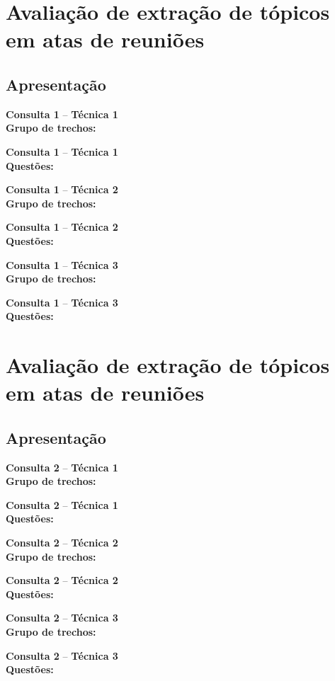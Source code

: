 \documentclass{article}
\newcommand{\resultsheader}[2] {
	\noindent \textbf{Consulta #1} -- \textbf{Técnica #2}
	 \vspace{0.5 cm} \\
	
}
\newcommand{\textfiled}{

	\vspace{0.5cm}
	\begin{tcolorbox}[colback = white]
		\vspace{1cm}

	\end{tcolorbox}
}
\begin{document}
\pagestyle{empty}

\section*{Avaliação de extração de tópicos em atas de reuniões}
\vspace{1cm}






\subsection*{Apresentação}


\textfiled

\newpage \resultsheader{1}{1} \noindent \textbf{Grupo de trechos:}
 
\newpage \resultsheader{1}{1}  \noindent \textbf{Questões:}


\newpage \resultsheader{1}{2} \noindent \textbf{Grupo de trechos:}
 	
\newpage  \resultsheader{1}{2} \noindent \textbf{Questões:}


\newpage \resultsheader{1}{3} \noindent \textbf{Grupo de trechos:}
 	
\newpage  \resultsheader{1}{3}  \noindent \textbf{Questões:}










\newpage


\section*{Avaliação de extração de tópicos em atas de reuniões}
\vspace{1cm}


\subsection*{Apresentação}


\textfiled

\newpage \resultsheader{2}{1} \noindent \textbf{Grupo de trechos:}
 
\newpage \resultsheader{2}{1}  \noindent \textbf{Questões:}


\newpage \resultsheader{2}{2} \noindent \textbf{Grupo de trechos:}
 	
\newpage  \resultsheader{2}{2} \noindent \textbf{Questões:}


\newpage \resultsheader{2}{3} \noindent \textbf{Grupo de trechos:}
 	
\newpage  \resultsheader{2}{3}  \noindent \textbf{Questões:}

\end{document}
